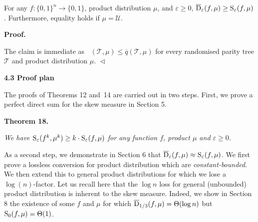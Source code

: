 For any $f\colon\{0,1\}^{n}\to\{0,1\}$, product distribution $\mu$, and $\varepsilon\geq 0$, $\overline{{\textup{D}}}_{\varepsilon}(f,\mu)\geq{\textup{S}}_{\varepsilon}(f,\mu)$. Furthermore, equality holds if $\mu=\mathcal{U}$.\par






\par\medskip\noindent\textbf{
\textbf{Proof}.}\par




The claim is immediate as $\mathop{\overline{sq}}(\mathcal{T},\mu)\leq\overline{q}(\mathcal{T},\mu)$ for every randomised parity tree $\mathcal{T}$ and product distribution $\mu$.
$\vartriangleleft$\par







\par\medskip\noindent\textbf{
4.3 Proof plan}\par




The proofs of Theorems 12 and 14 are carried out in two steps. First, we prove a perfect direct sum for the skew measure in Section 5.\par





\par\medskip\noindent\textbf{
\textbf{Theorem 18}\textbf{.}
}\par



\emph{We have ${\textup{S}}_{\varepsilon}(f^{k},\mu^{k})\geq k\cdot{\textup{S}}_{\varepsilon}(f,\mu)$ for any function $f$, product $\mu$ and $\varepsilon\geq 0$.}\par






As a second step, we demonstrate in Section 6 that $\overline{{\textup{D}}}_{\varepsilon}(f,\mu)\approx{\textup{S}}_{\varepsilon}(f,\mu)$. We first prove a lossless conversion for product distribution which are \emph{constant-bounded}. We then extend this to general product distributions for which we lose a $\log(n)$-factor. Let us recall here that the $\log n$ loss for general (unbounded) product distribution is inherent to the skew measure. Indeed, we show in Section 8 the existence of some $f$ and $\mu$ for which $\overline{{\textup{D}}}_{1/3}(f,\mu)=\Theta(\log n)$ but ${\textup{S}}_{0}(f,\mu)=\Theta(1)$.\par



